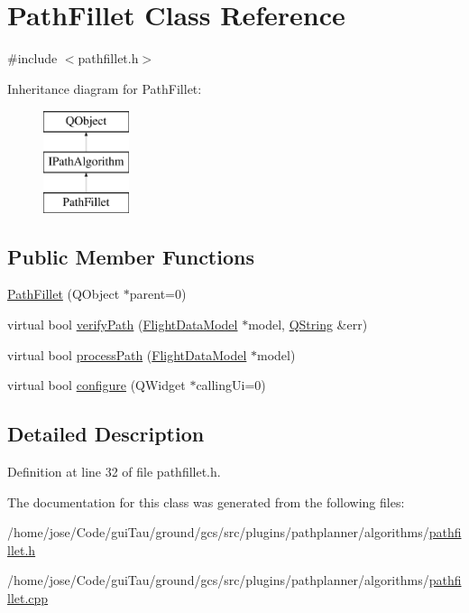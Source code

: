 \hypertarget{class_path_fillet}{\section{Path\-Fillet Class Reference}
\label{class_path_fillet}
}


{\ttfamily \#include $<$pathfillet.\-h$>$}

Inheritance diagram for Path\-Fillet\-:\begin{figure}[H]
\begin{center}
\leavevmode
\includegraphics[height=3.000000cm]{class_path_fillet}
\end{center}
\end{figure}
\subsection*{Public Member Functions}
\begin{DoxyCompactItemize}
\item 
\hyperlink{group___path_ga239ceff0ba45400e38be3f6641054f4c}{Path\-Fillet} (Q\-Object $\ast$parent=0)
\item 
virtual bool \hyperlink{group___path_gaf69499501bc26d9321cb3edaabaf8b21}{verify\-Path} (\hyperlink{class_flight_data_model}{Flight\-Data\-Model} $\ast$model, \hyperlink{group___u_a_v_objects_plugin_gab9d252f49c333c94a72f97ce3105a32d}{Q\-String} \&err)
\item 
virtual bool \hyperlink{group___path_ga1e32689145e646e17836652d3e90067c}{process\-Path} (\hyperlink{class_flight_data_model}{Flight\-Data\-Model} $\ast$model)
\item 
virtual bool \hyperlink{group___path_ga4ab477c2642c61f1169c6aa07228ec64}{configure} (Q\-Widget $\ast$calling\-Ui=0)
\end{DoxyCompactItemize}


\subsection{Detailed Description}


Definition at line 32 of file pathfillet.\-h.



The documentation for this class was generated from the following files\-:\begin{DoxyCompactItemize}
\item 
/home/jose/\-Code/gui\-Tau/ground/gcs/src/plugins/pathplanner/algorithms/\hyperlink{pathfillet_8h}{pathfillet.\-h}\item 
/home/jose/\-Code/gui\-Tau/ground/gcs/src/plugins/pathplanner/algorithms/\hyperlink{pathfillet_8cpp}{pathfillet.\-cpp}\end{DoxyCompactItemize}
